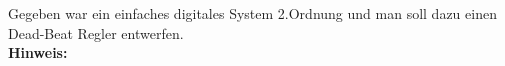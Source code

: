 \begin{question}[section=8,name={Deat Beat Regler},difficulty=,type=mdl,tags={}]
	Gegeben war ein einfaches digitales System 2.Ordnung und man soll dazu einen Dead-Beat Regler entwerfen.
	\\ \textbf{Hinweis:}\\
	
\end{question}
\begin{solution}
	
\end{solution}